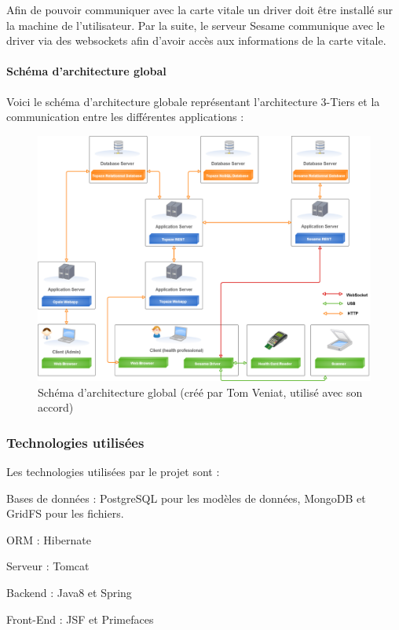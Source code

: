 Afin de pouvoir communiquer avec la carte vitale un driver doit être installé sur la machine de l'utilisateur. Par la suite, le serveur Sesame communique avec le driver via des websockets afin d'avoir accès aux informations de la carte vitale.

\paragraph*{Schéma d'architecture global\\}
Voici le schéma d'architecture globale représentant l'architecture 3-Tiers et la communication entre les différentes applications :
\begin{figure}[H]
  \centering
  \centerline{\includegraphics[width=20cm]{./img/architecture5}}
  \caption{\label{fig:mb_va_ast} Schéma d'architecture global (créé par Tom Veniat, utilisé avec son accord)}
\end{figure}

\subsubsection{Technologies utilisées}
Les technologies utilisées par le projet sont :
\begin{sitemize}
\item Bases de données : PostgreSQL pour les modèles de données, MongoDB et GridFS pour les fichiers.
\item ORM : Hibernate\cite{bib:hibernate}
\item Serveur : Tomcat
\item Backend : Java8\cite{bib:java8} et Spring\cite{bib:spring}
\item Front-End : JSF\cite{bib:jsf} et Primefaces
\end{sitemize} 

